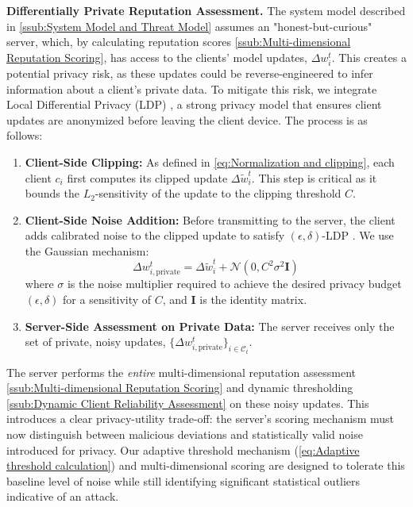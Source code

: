 \documentclass[lettersize,journal]{IEEEtran}
\begin{document}
{\textbf{Differentially Private Reputation Assessment.} 
The system model described in \cref{ssub:System Model and Threat Model} assumes an "honest-but-curious" server, which, by calculating reputation scores \cref{ssub:Multi-dimensional Reputation Scoring}, has access to the clients' model updates, $\Delta w_{i}^{t}$. This creates a potential privacy risk, as these updates could be reverse-engineered to infer information about a client's private data. To mitigate this risk, we integrate Local Differential Privacy (LDP) \cite{6686179}, a strong privacy model that ensures client updates are anonymized before leaving the client device. 
The process is as follows:
\begin{enumerate}[leftmargin=*,wide]
    \item \textbf{Client-Side Clipping:} As defined in \cref{eq:Normalization and clipping}, each client $c_i$ first computes its clipped update $\Delta\tilde{w}_{i}^{t}$. This step is critical as it bounds the $L_2$-sensitivity of the update to the clipping threshold $C$.

    \item \textbf{Client-Side Noise Addition:} Before transmitting to the server, the client adds calibrated noise to the clipped update to satisfy $(\epsilon, \delta)$-LDP \cite{10.1561/0400000042}. We use the Gaussian mechanism:
    \begin{equation}
    \Delta w_{i, \text{private}}^t = \Delta\tilde{w}_{i}^{t} + \mathcal{N}(0, C^2 \sigma^2 \mathbf{I})
    \label{eq:ldp_noise}
    \end{equation}
    where $\sigma$ is the noise multiplier required to achieve the desired privacy budget $(\epsilon, \delta)$ for a sensitivity of $C$, and $\mathbf{I}$ is the identity matrix.

    \item \textbf{Server-Side Assessment on Private Data:} The server receives only the set of private, noisy updates, $\{\Delta w_{i, \text{private}}^t\}_{i \in \mathcal{C}_t}$.
\end{enumerate}

The server performs the \textit{entire} multi-dimensional reputation assessment \cref{ssub:Multi-dimensional Reputation Scoring} and dynamic thresholding \ref{ssub:Dynamic Client Reliability Assessment} on these noisy updates. This introduces a clear privacy-utility trade-off: the server's scoring mechanism must now distinguish between malicious deviations and statistically valid noise introduced for privacy. Our adaptive threshold mechanism (\cref{eq:Adaptive threshold calculation}) and multi-dimensional scoring are designed to tolerate this baseline level of noise while still identifying significant statistical outliers indicative of an attack.

}
\end{document}
